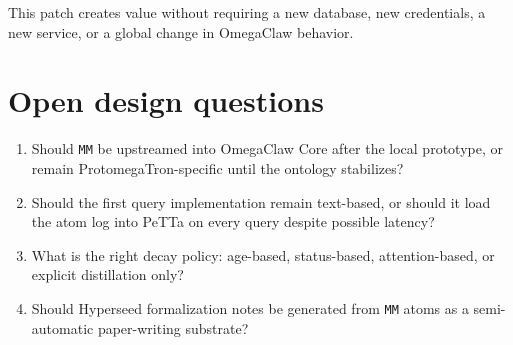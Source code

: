 \documentclass[11pt]{article}
\begin{document}
This patch creates value without requiring a new database, new credentials, a new
service, or a global change in OmegaClaw behavior.

\section{Open design questions}

\begin{enumerate}
  \item Should \texttt{MM} be upstreamed into OmegaClaw Core after the local prototype,
        or remain ProtomegaTron-specific until the ontology stabilizes?
  \item Should the first query implementation remain text-based, or should it load the
        atom log into PeTTa on every query despite possible latency?
  \item What is the right decay policy: age-based, status-based, attention-based, or
        explicit distillation only?
  \item Should Hyperseed formalization notes be generated from \texttt{MM} atoms as a
        semi-automatic paper-writing substrate?
\end{enumerate}
\end{document}

